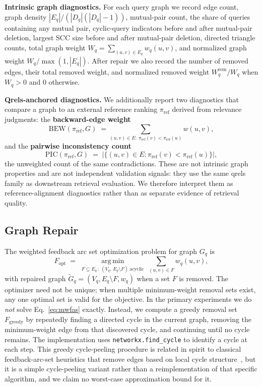 \documentclass[manuscript,anonymous,review]{acmart}
\begin{document}
\textbf{Intrinsic graph diagnostics.} For each query graph we record edge
count, graph density $|E_q|/(|D_q|(|D_q|-1))$, mutual-pair count, the share of
queries containing any mutual pair, cyclic-query indicators before and after
mutual-pair deletion, largest SCC size before and after mutual-pair deletion,
directed triangle counts, total graph weight
$W_q=\sum_{(u,v)\in E_q} w_q(u,v)$, and normalized graph weight
$W_q/\max(1,|E_q|)$. After repair we also record the number of removed edges,
their total removed weight, and normalized removed weight
$W_q^{\mathrm{rem}}/W_q$ when $W_q>0$ and $0$ otherwise.

\textbf{Qrels-anchored diagnostics.} We additionally report two diagnostics
that compare a graph to an external reference ranking $\pi_{\mathrm{ref}}$
derived from relevance judgments: the \textbf{backward-edge weight}
\begin{equation}
  \mathrm{BEW}(\pi_{\mathrm{ref}}, G) \;=\!\! \sum_{(u,v)\in E:\ \pi_{\mathrm{ref}}(v) < \pi_{\mathrm{ref}}(u)} \!\! w(u,v),
  \label{eq:bew}
\end{equation}
and the \textbf{pairwise inconsistency count}
\begin{equation}
  \mathrm{PIC}(\pi_{\mathrm{ref}}, G) \;=\; \bigl|\{(u,v)\in E : \pi_{\mathrm{ref}}(v) < \pi_{\mathrm{ref}}(u)\}\bigr|,
  \label{eq:pic}
\end{equation}
the unweighted count of the same contradictions. These are not intrinsic graph
properties and are not independent validation signals: they use the same qrels
family as downstream retrieval evaluation. We therefore interpret them as
reference-alignment diagnostics rather than as separate evidence of retrieval
quality.

\subsection{Graph Repair}
\label{sec:repair}

The weighted feedback arc set optimization problem for graph $G_q$ is
\begin{equation}
  F_{\mathrm{opt}} \;=\; \operatorname*{arg\,min}_{F \subseteq E_q \,:\ (V_q,\, E_q\setminus F)\ \text{acyclic}} \ \sum_{(u,v)\in F} w_q(u,v),
  \label{eq:mwfas}
\end{equation}
with repaired graph $\widetilde G_q = (V_q, E_q \setminus F, w_q)$ when a set
$F$ is removed. The optimizer need not be unique; when multiple minimum-weight
removal sets exist, any one optimal set is valid for the objective. In the
primary experiments we do \emph{not} solve Eq.~\eqref{eq:mwfas} exactly.
Instead, we compute a greedy removal set $F_{\mathrm{greedy}}$ by repeatedly
finding a directed cycle in the current graph, removing the minimum-weight edge
from that discovered cycle, and continuing until no cycle remains. The
implementation uses \texttt{networkx.find\_cycle} to identify a cycle at each
step. This greedy cycle-peeling procedure is related in spirit to classical
feedback-arc-set heuristics that remove edges based on local cycle
structure~\cite{eades1993heuristic}, but it is a simple cycle-peeling variant
rather than a reimplementation of that specific algorithm, and we claim no
worst-case approximation bound for it.
\end{document}
